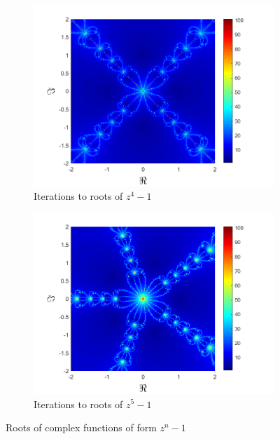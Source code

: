 \documentclass[letterpaper,11pt]{article}
\begin{document}
\begin{figure}
	\begin{subfigure}[b]{\fwidth}
		\includegraphics[width=\textwidth]{../Figures/Newton3.png}
		\caption{Iterations to roots of $z^4 - 1$}
		\label{fig:NI4}
	\end{subfigure}
	\begin{subfigure}[b]{\fwidth}
		\includegraphics[width=\textwidth]{../Figures/Newton4.png}
		\caption{Iterations to roots of $z^5 - 1$}
		\label{fig:NI5}
	\end{subfigure}
	\caption{Roots of complex functions of form $z^n - 1$}
	\label{fig:NI}
\end{figure}
\end{document}
